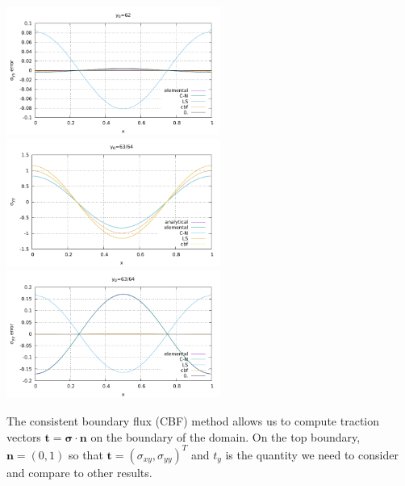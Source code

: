 \begin{center}
\includegraphics[width=7cm]{python_codes/fieldstone_27/results/62_64/sigmazz_error.pdf}\\
\includegraphics[width=7cm]{python_codes/fieldstone_27/results/63_64/sigmazz.pdf}
\includegraphics[width=7cm]{python_codes/fieldstone_27/results/63_64/sigmazz_error.pdf}
\end{center}

The consistent boundary flux (CBF) method allows us to compute traction vectors ${\bm t}={\bm \sigma}\cdot{\bm n}$
on the boundary of the domain. On the top boundary, ${\bm n}=(0,1)$ so that ${\bm t}=(\sigma_{xy}, \sigma_{yy})^T$ and 
$t_y$ is the quantity we need to consider and compare to other results.

